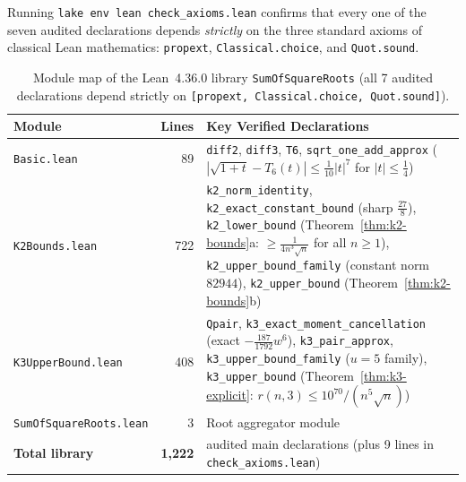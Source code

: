\documentclass[11pt,a4paper]{article}
\theoremstyle{definition}
\theoremstyle{remark}
\begin{document}
Running \texttt{lake env lean check\_axioms.lean} confirms that every one of the seven audited declarations depends \emph{strictly} on the three standard axioms of classical Lean mathematics: \texttt{propext}, \texttt{Classical.choice}, and \texttt{Quot.sound}.

\begin{table}[ht]
\centering
\footnotesize
\caption{Module map of the Lean~4.36.0 library \texttt{SumOfSquareRoots} (all 7 audited declarations depend strictly on \texttt{[propext, Classical.choice, Quot.sound]}).}
\label{tab:lean}
\begin{tabular}{@{}lr>{\raggedright\arraybackslash}p{8.6cm}@{}}
\toprule
Module & Lines & Key Verified Declarations \\
\midrule
\texttt{Basic.lean} & 89 &
\texttt{diff2}, \texttt{diff3}, \texttt{T6}, \texttt{sqrt\_one\_add\_approx} ($|\sqrt{1+t} - T_6(t)| \le \frac{1}{10}|t|^7$ for $|t| \le \frac{1}{4}$) \\[4pt]
\texttt{K2Bounds.lean} & 722 &
\texttt{k2\_norm\_identity}, \texttt{k2\_exact\_constant\_bound} (sharp $\frac{27}{8}$), \texttt{k2\_lower\_bound} (Theorem~\ref{thm:k2-bounds}a: $\ge \frac{1}{4 n^3\sqrt{n}}$ for all $n \ge 1$), \texttt{k2\_upper\_bound\_family} (constant norm $82944$), \texttt{k2\_upper\_bound} (Theorem~\ref{thm:k2-bounds}b) \\[4pt]
\texttt{K3UpperBound.lean} & 408 &
\texttt{Qpair}, \texttt{k3\_exact\_moment\_cancellation} (exact $-\frac{187}{1792} w^6$), \texttt{k3\_pair\_approx}, \texttt{k3\_upper\_bound\_family} ($u = 5$ family), \texttt{k3\_upper\_bound} (Theorem~\ref{thm:k3-explicit}: $r(n, 3) \le 10^{70}/(n^5\sqrt{n})$) \\[4pt]
\texttt{SumOfSquareRoots.lean} & 3 & Root aggregator module \\
\midrule
\textbf{Total library} & \textbf{1,222} & 7 audited main declarations (plus 9 lines in \texttt{check\_axioms.lean}) \\
\bottomrule
\end{tabular}
\end{table}
\end{document}
